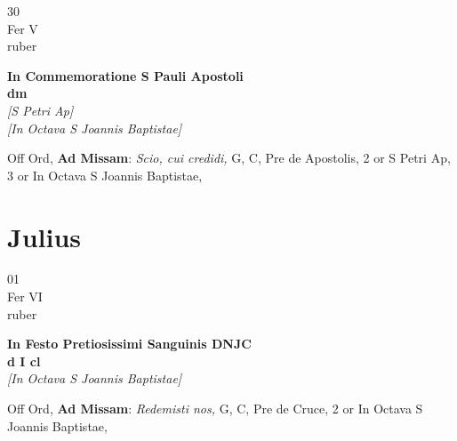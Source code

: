 \documentclass[10pt, openany]{book}
\begin{document}
        \begin{center}
            \begin{minipage}{3.5in}
                \vspace{2em}
                \begin{minipage}{0.5in}
                    {\Huge 30} \\
                    {\normalsize Fer V} \\
                    {\normalsize ruber}
                \end{minipage}
                \begin{minipage}{3.0in}
                    \textbf{ \large In Commemoratione S Pauli Apostoli \\
                    \textnormal{\normalsize dm}} \\ \textit{[S Petri Ap]} \\ \textit{[In Octava S Joannis Baptistae]} \\ 
                \end{minipage}
                \begin{justify}Off Ord, \textbf{Ad Missam}: \textit{Scio, cui credidi,} G, C, Pre de Apostolis, 2 or S Petri Ap, 3 or In Octava S Joannis Baptistae,   
                \end{justify}
            \end{minipage}
        \end{center}
    
        \chapter{Julius}
                        
        \begin{center}
            \begin{minipage}{3.5in}
                \vspace{2em}
                \begin{minipage}{0.5in}
                    {\Huge 01} \\
                    {\normalsize Fer VI} \\
                    {\normalsize ruber}
                \end{minipage}
                \begin{minipage}{3.0in}
                    \textbf{ \large In Festo Pretiosissimi Sanguinis DNJC \\
                    \textnormal{\normalsize d I cl}} \\ \textit{[In Octava S Joannis Baptistae]} \\ 
                \end{minipage}
                \begin{justify}Off Ord, \textbf{Ad Missam}: \textit{Redemisti nos,} G, C, Pre de Cruce, 2 or In Octava S Joannis Baptistae,   
                \end{justify}
            \end{minipage}
        \end{center}
    
\end{document}
